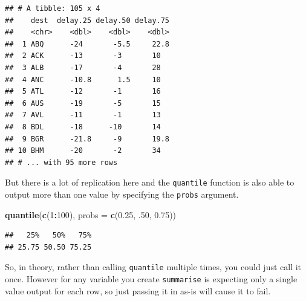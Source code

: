 \documentclass[]{book}
\newenvironment{Shaded}{\begin{snugshade}}{\end{snugshade}}
\newcommand{\DataTypeTok}[1]{\textcolor[rgb]{0.13,0.29,0.53}{#1}}
\newcommand{\DecValTok}[1]{\textcolor[rgb]{0.00,0.00,0.81}{#1}}
\newcommand{\FloatTok}[1]{\textcolor[rgb]{0.00,0.00,0.81}{#1}}
\newcommand{\KeywordTok}[1]{\textcolor[rgb]{0.13,0.29,0.53}{\textbf{#1}}}
\newcommand{\NormalTok}[1]{#1}
\newcommand{\OperatorTok}[1]{\textcolor[rgb]{0.81,0.36,0.00}{\textbf{#1}}}
\newcommand{\OtherTok}[1]{\textcolor[rgb]{0.56,0.35,0.01}{#1}}
\newcommand{\StringTok}[1]{\textcolor[rgb]{0.31,0.60,0.02}{#1}}
\theoremstyle{definition}
\theoremstyle{definition}
\theoremstyle{definition}
\theoremstyle{remark}
\begin{document}
\begin{verbatim}
## # A tibble: 105 x 4
##    dest  delay.25 delay.50 delay.75
##    <chr>    <dbl>    <dbl>    <dbl>
##  1 ABQ      -24       -5.5     22.8
##  2 ACK      -13       -3       10  
##  3 ALB      -17       -4       28  
##  4 ANC      -10.8      1.5     10  
##  5 ATL      -12       -1       16  
##  6 AUS      -19       -5       15  
##  7 AVL      -11       -1       13  
##  8 BDL      -18      -10       14  
##  9 BGR      -21.8     -9       19.8
## 10 BHM      -20       -2       34  
## # ... with 95 more rows
\end{verbatim}

But there is a lot of replication here and the \texttt{quantile}
function is also able to output more than one value by specifying the
\texttt{probs} argument.

\begin{Shaded}
\begin{Highlighting}[]
\KeywordTok{quantile}\NormalTok{(}\KeywordTok{c}\NormalTok{(}\DecValTok{1}\OperatorTok{:}\DecValTok{100}\NormalTok{), }\DataTypeTok{probs =} \KeywordTok{c}\NormalTok{(}\FloatTok{0.25}\NormalTok{, }\FloatTok{.50}\NormalTok{, }\FloatTok{0.75}\NormalTok{))}
\end{Highlighting}
\end{Shaded}

\begin{verbatim}
##   25%   50%   75% 
## 25.75 50.50 75.25
\end{verbatim}

So, in theory, rather than calling \texttt{quantile} multiple times, you
could just call it once. However for any variable you create
\texttt{summarise} is expecting only a single value output for each row,
so just passing it in as-is will cause it to fail.

\begin{Shaded}
\end{Shaded}
\end{document}
